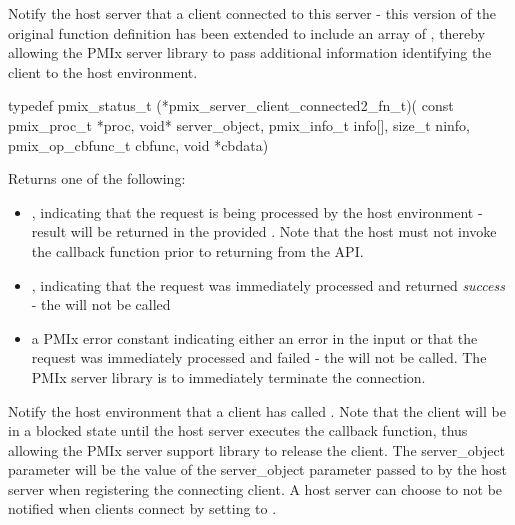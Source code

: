 Notify the host server that a client connected to this server - this version of the original function definition has been extended to include an array of , thereby allowing the \ac{PMIx} server library to pass additional information identifying the client to the host environment.

\format

\cspecificstart
\begin{codepar}
typedef pmix_status_t (*pmix_server_client_connected2_fn_t)(
                             const pmix_proc_t *proc,
                             void* server_object,
                             pmix_info_t info[], size_t ninfo,
                             pmix_op_cbfunc_t cbfunc,
                             void *cbdata)
\end{codepar}
\cspecificend

\begin{arglist}
\end{arglist}

Returns one of the following:

\begin{itemize}
    \item {}, indicating that the request is being processed by the host environment - result will be returned in the provided . Note that the host must not invoke the callback function prior to returning from the \ac{API}.
    \item {}, indicating that the request was immediately processed and returned \textit{success} - the  will not be called
    \item a PMIx error constant indicating either an error in the input or that the request was immediately processed and failed - the  will not be called. The \ac{PMIx} server library is to immediately terminate the connection.
\end{itemize}

\descr

Notify the host environment that a client has called .
Note that the client will be in a blocked state until the host server executes the callback function, thus allowing the \ac{PMIx} server support library to release
the client.
The server_object parameter will be the value of the server_object parameter passed to
 by the host server when registering the connecting client. A host server can choose to not be notified when clients connect by setting  to .

